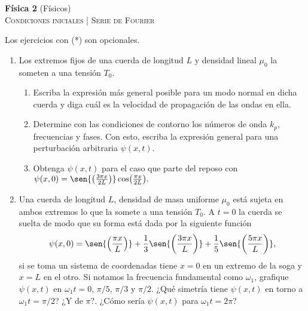 \documentclass[11pt,spanish,a4paper]{article}
\begin{document}
\begin{center}
\textbf{Física 2} (Físicos) \hfill {}\\
	\textsc{\LARGE Condiciones iniciales | Serie de Fourier}
\end{center}

Los ejercicios con (*) son opcionales.

\begin{enumerate}


\subsection*{Condiciones iniciales en cuerdas}

\item Los extremos fijos de una cuerda de longitud $L$ y densidad lineal $\mu_0$ la someten a una tensión $T_0$.
\begin{enumerate}
	\item Escriba la expresión más general posible para un modo normal en dicha cuerda y diga cuál es la velocidad de propagación de las ondas en ella.
	\item Determine con las condiciones de contorno los números de onda $k_p$, frecuencias y fases.
	Con esto, escriba la expresión general para una perturbación arbitraria $\psi(x,t)$.
	\item Obtenga $\psi(x,t)$ para el caso que parte del reposo con
	$
	\psi(x,0) = \sen{\left( \frac{3\pi x}{2L} \right)} \cos( \frac{\pi x}{2L} ).
	$
\end{enumerate}


\item Una cuerda de longitud $L$, densidad de masa uniforme $\mu_{0}$ está sujeta en ambos extremos lo que la somete a una tensión $T_{0}$.
A $t=0$ la cuerda se suelta de modo que su forma está dada por la siguiente función
$$
\psi(x,0) = \sen{ \left(\frac{\pi x}{L} \right) } + \frac{1}{3} \sen{ \left( \frac{3\pi x}{L} \right) } + \frac{1}{5} \sen{ \left( \frac{5\pi x}{L} \right) },
$$
si se toma un sistema de coordenadas tiene $x=0$ en un extremo de la soga y $x = L$ en el otro. 
	Si notamos la frecuencia fundamental como $\omega_{1}$, grafique $\psi(x,t)$ en $\omega_1 t = 0,\,\pi/5,\,\pi/3$ y $\pi/2$.
	¿Qué simetría tiene $\psi(x,t)$ en torno a $\omega_1 t = \pi/2$?
	¿Y de $\pi$?.
	¿Cómo sería $\psi(x,t)$ para $\omega_1 t = 2 \pi$?



\end{enumerate}
\end{document}
